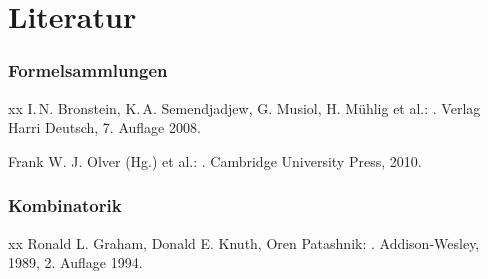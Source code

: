
\chapter*{Literatur}
\subsection*{Formelsammlungen}

\begin{bibenumerate}{xx}
 I.\,N. Bronstein, K.\,A. Semendjadjew,
G. Musiol, H. Mühlig et al.:
. Verlag Harri Deutsch, 7. Auflage
2008.

Frank W. J. Olver (Hg.) et al.:
.
Cambridge University Press, 2010.
\end{bibenumerate}

\subsection*{Kombinatorik}
\begin{bibenumerate}{xx}
Ronald L. Graham, Donald E. Knuth, Oren Patashnik:
. Addison-Wesley, 1989,
2. Auflage 1994.


\end{bibenumerate}



